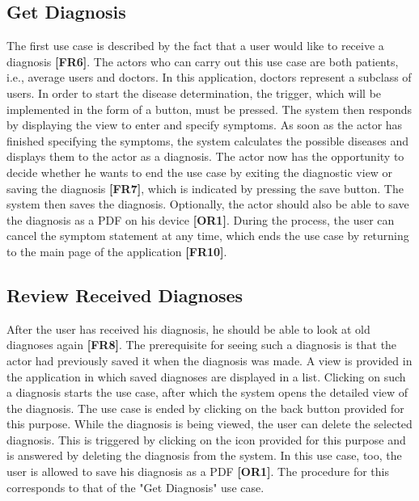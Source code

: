 \subsection{Get Diagnosis}
The first use case is described by the fact that a user would like to receive a diagnosis \textbf{[FR6]}. The actors who can carry out this use case are both patients, i.e., average users and doctors. In this application, doctors represent a subclass of users. In order to start the disease determination, the trigger, which will be implemented in the form of a button, must be pressed. The system then responds by displaying the view to enter and specify symptoms. As soon as the actor has finished specifying the symptoms, the system calculates the possible diseases and displays them to the actor as a diagnosis. The actor now has the opportunity to decide whether he wants to end the use case by exiting the diagnostic view or saving the diagnosis \textbf{[FR7]}, which is indicated by pressing the save button. The system then saves the diagnosis. Optionally, the actor should also be able to save the diagnosis as a PDF on his device \textbf{[OR1]}. During the process, the user can cancel the symptom statement at any time, which ends the use case by returning to the main page of the application \textbf{[FR10]}.

\subsection{Review Received Diagnoses}
After the user has received his diagnosis, he should be able to look at old diagnoses again \textbf{[FR8]}. The prerequisite for seeing such a diagnosis is that the actor had previously saved it when the diagnosis was made. A view is provided in the application in which saved diagnoses are displayed in a list. Clicking on such a diagnosis starts the use case, after which the system opens the detailed view of the diagnosis. The use case is ended by clicking on the back button provided for this purpose. While the diagnosis is being viewed, the user can delete the selected diagnosis. This is triggered by clicking on the icon provided for this purpose and is answered by deleting the diagnosis from the system. In this use case, too, the user is allowed to save his diagnosis as a PDF \textbf{[OR1]}. The procedure for this corresponds to that of the "Get Diagnosis" use case.

